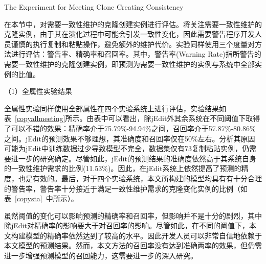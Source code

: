 {The Experiment for Meeting Clone Creating Consistency}

在本节中，对需要一致性维护的克隆创建实例进行评估。将关注需要一致性维护的克隆实例，由于其在演化过程中可能会引发一致性变化，因此需要警告程序开发人员谨慎的执行复制和粘贴操作，避免额外的维护代价。实验同样使用三个度量对方法进行评估：警告率、精确率和召回率。其中，警告率(Warning Rate)指所警告的需要一致性维护的克隆创建实例，即预测为需要一致性维护的实例与系统中全部实例的比值。


（1）全属性实验结果

全属性实验同样使用全部属性在四个实验系统上进行评估，实验结果如表~\ref{copyallmeeting}所示。由表中可以看出，除jEdit外其余系统在不同阈值下取得了可以不错的效果：精确率介于75.79\%-94.94\%之间，召回率介于57.87\%-80.86\%之间。jEdit的预测效果不够理想，其准确度和召回率仅在50\%左右。分析其原因可能为jEdit中训练数据过少导致模型不完全，数据集仅有73复制粘贴实例，仍需要进一步的研究确定。尽管如此，jEdit的预测结果的准确度依然高于其系统自身的一致性维护需求的比例(11.53\%)。因此，在jEdit系统上依然提高了预测的精度，也是有效的。最后，对于四个实验系统，本文所构建的模型均具有有十分合理的警告率，警告率十分接近于满足一致性维护需求的克隆变化实例的比例（如表~\ref {copysta}~中所示）。

虽然阈值的变化可以影响预测的精确率和召回率，但影响并不是十分的剧烈，其中除jEdit对精确率的影响要大于对召回率的影响。尽管如此，在不同的阈值下，本文构建模型的精确率依然达到了较高的水平。因此开发人员可以非常自信地依赖于本文模型的预测结果。然而，本文方法的召回率没有达到准确两率的效果，但仍需进一步增强预测模型的召回能力，这需要进一步的深入研究。

